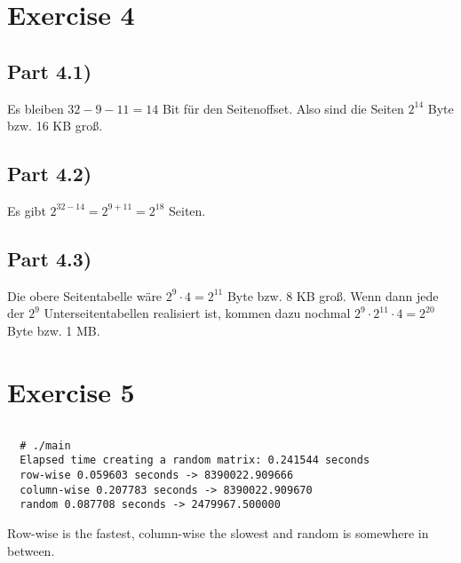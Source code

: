 \documentclass[10pt,a4paper]{article}
\begin{document}
\section*{Exercise 4}

\subsection*{Part 4.1)}

Es bleiben $32 - 9 - 11 = 14$ Bit für den Seitenoffset.
Also sind die Seiten $2^{14}$ Byte bzw. 16 KB groß.

\subsection*{Part 4.2)}

Es gibt $2^{32 - 14} = 2^{9 + 11} = 2^{18}$ Seiten.

\subsection*{Part 4.3)}

Die obere Seitentabelle wäre $2^{9} \cdot 4 = 2^{11}$ Byte bzw. 8 KB groß.
Wenn dann jede der $2^{9}$ Unterseitentabellen realisiert ist, kommen dazu nochmal $2^{9} \cdot 2^{11} \cdot 4 = 2^{20}$ Byte bzw. 1 MB.

\section*{Exercise 5}

\inputminted{c}{sheet-9/main.c}

\begin{verbatim}
  # ./main
  Elapsed time creating a random matrix: 0.241544 seconds
  row-wise 0.059603 seconds -> 8390022.909666
  column-wise 0.207783 seconds -> 8390022.909670
  random 0.087708 seconds -> 2479967.500000
\end{verbatim}

Row-wise is the fastest, column-wise the slowest and random is somewhere in between.
\end{document}
